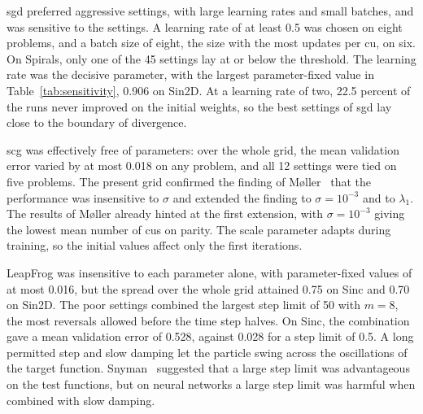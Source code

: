 \documentclass[conference]{IEEEtran}
\begin{document}
\begin{table}[!t]
\centering
\caption{Chosen control parameters}
\label{tab:params}
\footnotesize

\end{table}

\begin{table}[t]
\centering
\caption{Sensitivity to the control parameters}
\label{tab:sensitivity}
\footnotesize
\setlength{\tabcolsep}{4pt}

\end{table}

\Gls{sgd} preferred aggressive settings, with large learning rates and small
batches, and was sensitive to the settings. A
learning rate of at least 0.5 was chosen on eight problems, and a batch size of
eight, the size with the most updates per \gls{cu}, on six. On
Spirals, only one of the 45 settings lay at or below the threshold. The
learning rate was the decisive parameter, with the largest parameter-fixed value
in Table~\ref{tab:sensitivity}, 0.906 on Sin2D.
At a learning rate of two, 22.5 percent of the runs never improved on the initial
weights, so the best settings of \gls{sgd} lay close to the boundary of
divergence.

\Gls{scg} was effectively free of parameters: over the whole grid, the mean
validation error varied by at most 0.018 on any problem, and all 12 settings were
tied on five problems. The present grid confirmed the finding of
M{\o}ller~\cite{moller1993} that the performance was insensitive to $\sigma$ and
extended the finding to $\sigma = 10^{-3}$ and to
$\lambda_1$. The results of M{\o}ller already hinted at the first extension, with
$\sigma = 10^{-3}$ giving the lowest mean number of \glspl{cu} on parity. The scale
parameter adapts during training, so the initial values affect only the first
iterations.

LeapFrog was insensitive to each parameter alone, with parameter-fixed values of
at most 0.016,
but the spread over the whole grid attained 0.75 on Sinc and 0.70 on Sin2D. The
poor settings combined the largest step limit of 50 with $m = 8$, the most
reversals allowed before the time step halves. On Sinc, the combination gave a mean validation error of 0.528, against
0.028 for a step limit of 0.5. A long permitted step and slow
damping let the particle swing across the oscillations of the target function.
Snyman~\cite{snyman1983} suggested that a large step limit was advantageous on the
test functions, but on neural networks a large step limit was harmful when
combined with slow damping.
\end{document}
